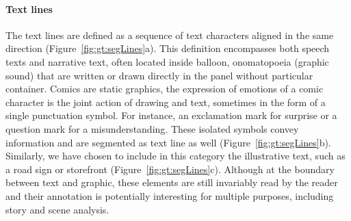 \paragraph{Text lines} %
\label{par:text_lines}
The text lines are defined as a sequence of text characters aligned in the same direction (Figure~\ref{fig:gt:segLines}a).
This definition encompasses both speech texts and narrative text, often located inside balloon, onomatopoeia (graphic sound) that are written or drawn directly in the panel without particular container.
Comics are static graphics, the expression of emotions of a comic character is the joint action of drawing and text, sometimes in the form of a single punctuation symbol.
For instance, an exclamation mark for surprise or a question mark for a misunderstanding.
These isolated symbols convey information and are segmented as text line as well (Figure~\ref{fig:gt:segLines}b).
Similarly, we have chosen to include in this category the illustrative text, such as a road sign or storefront (Figure~\ref{fig:gt:segLines}c).
Although at the boundary between text and graphic, these elements are still invariably read by the reader and their annotation is potentially interesting for multiple purposes, including story and scene analysis.

